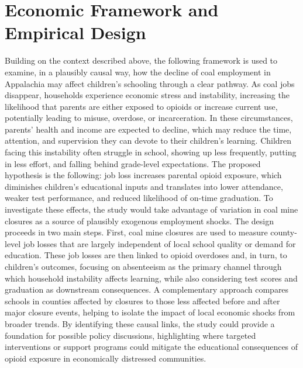 \section*{Economic Framework and Empirical Design}
Building on the context described above, the following framework is used to examine, in a plausibly causal way, how the decline of coal employment in Appalachia may affect children’s schooling through a clear pathway. As coal jobs disappear, households experience economic stress and instability, increasing the likelihood that parents are either exposed to opioids or increase current use, potentially leading to misuse, overdose, or incarceration. In these circumstances, parents’ health and income are expected to decline, which may reduce the time, attention, and supervision they can devote to their children’s learning. Children facing this instability often struggle in school, showing up less frequently, putting in less effort, and falling behind grade-level expectations.  The proposed hypothesis is the following: job loss increases parental opioid exposure, which diminishes children’s educational inputs and translates into lower attendance, weaker test performance, and reduced likelihood of on-time graduation. To investigate these effects, the study would take advantage of variation in coal mine closures as a source of plausibly exogenous employment shocks. The design proceeds in two main steps. First, coal mine closures are used to measure county-level job losses that are largely independent of local school quality or demand for education. These job losses are then linked to opioid overdoses and, in turn, to children’s outcomes, focusing on absenteeism as the primary channel through which household instability affects learning, while also considering test scores and graduation as downstream consequences. A complementary approach compares schools in counties affected by closures to those less affected before and after major closure events, helping to isolate the impact of local economic shocks from broader trends. By identifying these causal links, the study could provide a foundation for possible policy discussions, highlighting where targeted interventions or support programs could mitigate the educational consequences of opioid exposure in economically distressed communities.
